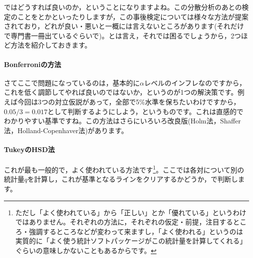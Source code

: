 \documentclass{ltjbook}
\begin{document}


ではどうすれば良いのか，ということになりますよね。この分散分析のあとの検定のことをとかといったりしますが，この事後検定については様々な方法が提案されており，どれが良い・悪いと一概には言えないところがあります(それだけで専門書一冊出ているぐらいで\citep{BA33892274})。とは言え，それでは困るでしょうから，2つほど方法を紹介しておきます。

\paragraph{Bonferroniの方法}さてここで問題になっているのは，基本的に$\alpha$レベルのインフレなのですから，これを低く調節してやれば良いのではないか，というのが1つの解決策です。例えば今回は3つの対立仮説があって，全部で5\%水準を保ちたいわけですから，$0.05/3=0.017$として判断するようにしよう，というものです。これは直感的でわかりやすい基準ですね。この方法はさらにいろいろ改良版(Holm法，Shaffer	法，Holland-Copenhaver法)があります。

\paragraph{TukeyのHSD法}これが最も一般的で，よく使われている方法です\footnote{ただし「よく使われている」から「正しい」とか「優れている」というわけではありません。それぞれの方法に，それぞれの仮定・前提，注目するところ・強調するところなどが変わって来ますし，「よく使われる」というのは実質的に「よく使う統計ソフトパッケージがこの統計量を計算してくれる」ぐらいの意味しかないこともあるからです。}。ここでは各対について別の統計量$q$を計算し，これが基準となるラインをクリアするかどうか，で判断します。
\end{document}
